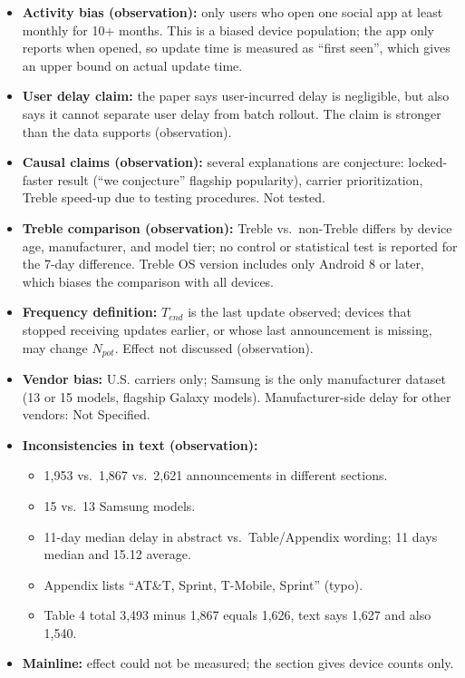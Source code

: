 \documentclass[11pt,a4paper]{article}
\begin{document}
\begin{enumerate}
\begin{itemize}[leftmargin=*, itemsep=1pt, topsep=2pt]
        \item \textbf{Activity bias (observation):} only users who open one social app at least monthly for 10+ months. This is a biased device population; the app only reports when opened, so update time is measured as ``first seen'', which gives an upper bound on actual update time.
        \item \textbf{User delay claim:} the paper says user-incurred delay is negligible, but also says it cannot separate user delay from batch rollout. The claim is stronger than the data supports (observation).
        \item \textbf{Causal claims (observation):} several explanations are conjecture: locked-faster result (``we conjecture'' flagship popularity), carrier prioritization, Treble speed-up due to testing procedures. Not tested.
        \item \textbf{Treble comparison (observation):} Treble vs.\ non-Treble differs by device age, manufacturer, and model tier; no control or statistical test is reported for the 7-day difference. Treble OS version includes only Android 8 or later, which biases the comparison with all devices.
        \item \textbf{Frequency definition:} $T_{end}$ is the last update observed; devices that stopped receiving updates earlier, or whose last announcement is missing, may change $N_{pot}$. Effect not discussed (observation).
        \item \textbf{Vendor bias:} U.S. carriers only; Samsung is the only manufacturer dataset (13 or 15 models, flagship Galaxy models). Manufacturer-side delay for other vendors: Not Specified.
        \item \textbf{Inconsistencies in text (observation):}
        \begin{itemize}[itemsep=0pt]
            \item 1,953 vs.\ 1,867 vs.\ 2,621 announcements in different sections.
            \item 15 vs.\ 13 Samsung models.
            \item 11-day median delay in abstract vs.\ Table/Appendix wording; 11 days median and 15.12 average.
            \item Appendix lists ``AT\&T, Sprint, T-Mobile, Sprint'' (typo).
            \item Table 4 total 3,493 minus 1,867 equals 1,626, text says 1,627 and also 1,540.
        \end{itemize}
        \item \textbf{Mainline:} effect could not be measured; the section gives device counts only.

\end{itemize}
\end{enumerate}
\end{document}
